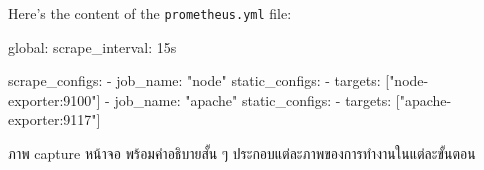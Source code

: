 \documentclass[a4paper, 10pt]{article}
\begin{document}
\begin{solution}
	Here's the content of the \texttt{prometheus.yml} file:
	\begin{codingbox}[language=yaml]
global:
  scrape_interval: 15s

scrape_configs:
- job_name: "node"
  static_configs:
    - targets: ["node-exporter:9100"]
- job_name: "apache"
  static_configs:
    - targets: ["apache-exporter:9117"]
\end{codingbox}
\end{solution}

\begin{problem}
\textthai{ภาพ} capture \textthai{หน้าจอ พร้อมคำอธิบายสั้น ๆ ประกอบแต่ละภาพของการทำงานในแต่ละขั้นตอน}
\end{problem}
\end{document}
